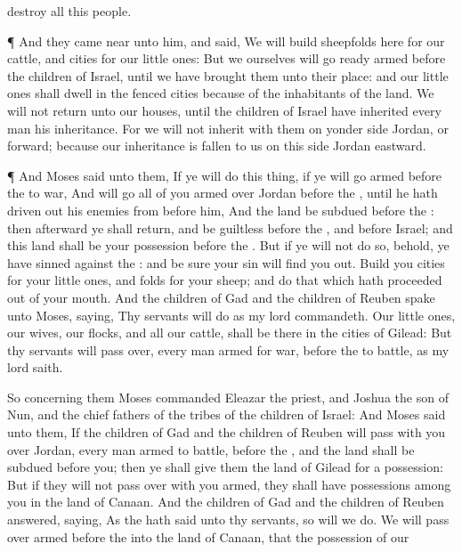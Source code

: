 {destroy all this
people.
\par }{\PP {}¶ And they came
near unto him, and
said, We will
build
sheepfolds here for our
cattle, and
cities for our little
ones:
But we
ourselves will go
ready
armed
before the
children of
Israel, until we have
brought them unto their
place: and our little
ones shall
dwell in the
fenced
cities
because of the
inhabitants of the
land.
We will not
return unto our
houses, until the
children of
Israel have
inherited every
man his
inheritance.
For we will not
inherit with them on yonder
side
Jordan, or
forward; because our
inheritance is
fallen to us on this
side
Jordan
eastward.
\par }{\PP {}¶ And
Moses
said unto them, If ye will
do this
thing, if ye will go
armed
before the
{} to
war,
And will
go all of you
armed
over
Jordan
before the
{}, until he hath driven
out his
enemies from
before him,
And the
land be
subdued
before the
{}: then
afterward ye shall
return, and be
guiltless before the
{}, and before
Israel; and this
land shall be your
possession
before the
{}.
But if ye will not do
so, behold, ye have
sinned against the
{}: and be
sure your
sin will find you
out.
Build you
cities for your little
ones, and
folds for your
sheep; and
do that which hath
proceeded out of your
mouth.
And the
children of
Gad and the
children of
Reuben
spake unto
Moses,
saying, Thy
servants will
do as my
lord
commandeth.
Our little
ones, our
wives, our
flocks, and all our
cattle, shall be there in the
cities of
Gilead:
But thy
servants will pass
over, every man
armed for
war,
before the
{} to
battle, as my
lord
saith.
\par }{\PP {}So concerning them
Moses
commanded
Eleazar the
priest, and
Joshua the
son of
Nun, and the
chief
fathers of the
tribes of the
children of
Israel:
And
Moses
said unto them, If the
children of
Gad and the
children of
Reuben will pass with you
over
Jordan, every man
armed to
battle,
before the
{}, and the
land shall be
subdued
before you; then ye shall
give them the
land of
Gilead for a
possession:
But if they will not pass
over with you
armed, they shall have
possessions
among you in the
land of
Canaan.
And the
children of
Gad and the
children of
Reuben
answered,
saying, As the
{} hath
said unto thy
servants, so will we
do.
We
will pass
over
armed
before the
{} into the
land of
Canaan, that the
possession of our
}
